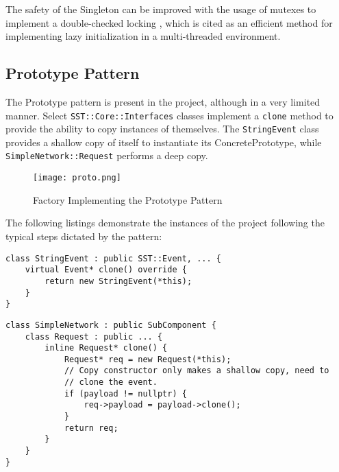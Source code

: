 The safety of the Singleton can be improved with the usage of mutexes to implement a double-checked locking \cite{dcl}, which is cited as an efficient method for implementing lazy initialization in a multi-threaded environment.


\newpage
\subsection{Prototype Pattern}
The Prototype pattern is present in the project, although in a very limited manner. Select \texttt{SST::Core::Interfaces} classes implement a \texttt{clone} method to provide the ability to copy instances of themselves. The \texttt{StringEvent} class provides a shallow copy of itself to instantiate its ConcretePrototype, while \texttt{SimpleNetwork::Request} performs a deep copy.

\begin{figure}[h]
    \caption{Factory Implementing the Prototype Pattern}
    \centering
    \texttt{[image: proto.png]}
\end{figure}

The following listings demonstrate the instances of the project following the typical steps dictated by the pattern:

\begin{lstlisting}[style=customC++,label=prototype1,caption=StringEvent Implementing the Prototype Pattern \\ File: src/sst/core/interfaces/stringEvent.h]
class StringEvent : public SST::Event, ... {
    virtual Event* clone() override {
        return new StringEvent(*this);
    }
}
\end{lstlisting}

\begin{lstlisting}[style=customC++,label=prototype2,caption=SimpleNetwork::Request Implementing the Prototype Pattern \\ File: src/sst/core/interfaces/simpleNetwork.h]
class SimpleNetwork : public SubComponent {
    class Request : public ... {
        inline Request* clone() {
            Request* req = new Request(*this);
            // Copy constructor only makes a shallow copy, need to
            // clone the event.
            if (payload != nullptr) {
                req->payload = payload->clone();
            }
            return req;
        }
    }
}
\end{lstlisting}
